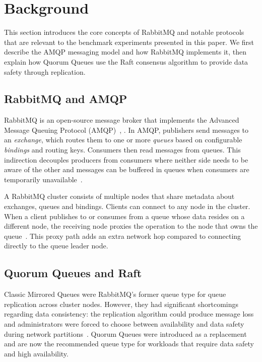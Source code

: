 \section{Background}

This section introduces the core concepts of RabbitMQ and notable protocols that are relevant to the benchmark experiments presented in this paper. We first describe the AMQP messaging model and how RabbitMQ implements it, then explain how Quorum Queues use the Raft consensus algorithm to provide data safety through replication.

\subsection{RabbitMQ and AMQP}
RabbitMQ is an open-source message broker that implements the Advanced Message Queuing Protocol (AMQP)~\cite{amqp_spec}, \cite{rmq_amqp_docs}. In AMQP, publishers send messages to an \textit{exchange}, which routes them to one or more \textit{queues} based on configurable \textit{bindings} and routing keys. Consumers then read messages from queues. This indirection decouples producers from consumers where neither side needs to be aware of the other and messages can be buffered in queues when consumers are temporarily unavailable~\cite{Magnoni_2015}.

A RabbitMQ cluster consists of multiple nodes that share metadata about exchanges, queues and bindings. Clients can connect to any node in the cluster. When a client publishes to or consumes from a queue whose data resides on a different node, the receiving node proxies the operation to the node that owns the queue~\cite{rmq_clustering_docs}. This proxy path adds an extra network hop compared to connecting directly to the queue leader node.

\subsection{Quorum Queues and Raft}
Classic Mirrored Queues were RabbitMQ's former queue type for queue replication across cluster nodes. However, they had significant shortcomings regarding data consistency: the replication algorithm could produce message loss and administrators were forced to choose between availability and data safety during network partitions~\cite{rmq_ha_upgrade_blog}. Quorum Queues were introduced as a replacement and are now the recommended queue type for workloads that require data safety and high availability.

